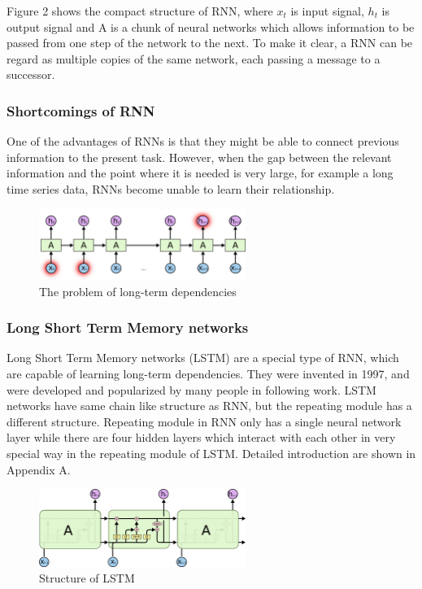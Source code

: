 Figure 2 shows the compact structure of RNN, where $x_t$ is input signal, $h_t$ is output signal and A is a chunk of neural networks which allows information to be passed from one step of the network to the next. To make it clear, a RNN can be regard as multiple copies of the same network, each passing a message to a successor.

\subsubsection{Shortcomings of RNN}
One of the advantages of RNNs is that they might be able to connect previous information to the present task. However, when the gap between the relevant information and the point where it is needed is very large, for example a long time series data, RNNs become unable to learn their relationship.

\begin{figure}[]
\centering
\includegraphics[width=0.6\textwidth]{figures/RNN-longtermdependencies.png}
\caption{The problem of long-term dependencies}
\label{fig:B-B1}
\end{figure}

\subsubsection{Long Short Term Memory networks}
Long Short Term Memory networks (LSTM) are a special type of RNN, which are capable of learning long-term dependencies. They were invented in 1997, and were developed and popularized by many people in following work. LSTM networks have same chain like structure as RNN, but the repeating module has a different structure. Repeating module in RNN only has a single neural network layer while there are four hidden layers which interact with each other in very special way in the repeating module of LSTM. Detailed introduction are shown in Appendix A.

\begin{figure}[]
\centering
\includegraphics[width=0.6\textwidth]{figures/LSTM.png}
\caption{Structure of LSTM}
\label{fig:B-B1}
\end{figure}

